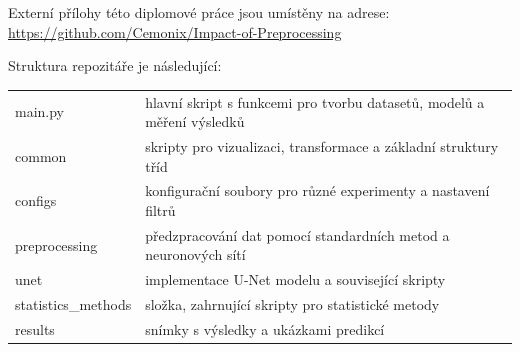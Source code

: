 \documentclass[male,czech,api_ing]{thesis}
\begin{document}


Externí přílohy této diplomové práce jsou umístěny na adrese: \\
\url{https://github.com/Cemonix/Impact-of-Preprocessing}

Struktura repozitáře je následující:
\begin{longtable}{ll}
\hline
main.py & hlavní skript s funkcemi pro tvorbu datasetů, modelů a měření výsledků \\
common & skripty pro vizualizaci, transformace a základní struktury tříd \\
configs & konfigurační soubory pro různé experimenty a nastavení filtrů \\
preprocessing & předzpracování dat pomocí standardních metod a neuronových sítí \\
unet & implementace U-Net modelu a související skripty \\
statistics\_methods & složka, zahrnující skripty pro statistické metody \\
results & snímky s výsledky a ukázkami predikcí \\
\hline
\end{longtable}

\end{document}

